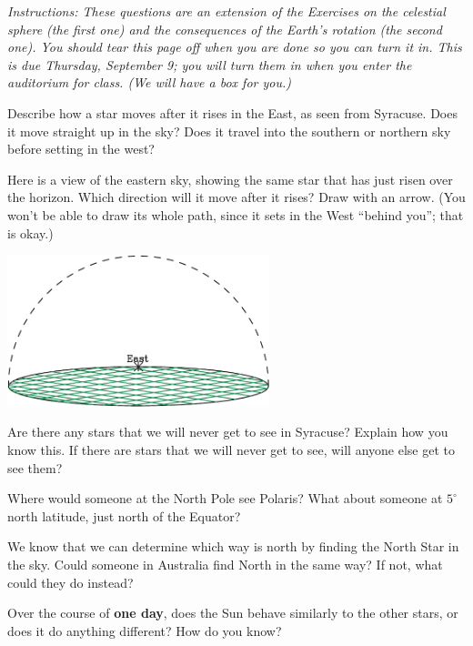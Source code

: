 \documentclass[12pt]{article}
\newcommand{\insp}{\vspace{1in}}
\newcommand{\BS}{\bigskip}
\begin{document}
{\it Instructions: These questions are an extension of the Exercises on the celestial sphere (the first one) and the consequences of the Earth's rotation (the second one). You should tear this page off when you are done so you can turn it in. This is due Thursday, September 9; you will turn them in when you enter the auditorium for class. (We will have a box for you.)}	

\begin{enumerate}
	\item Describe how a star moves after it rises in the East, as seen from Syracuse. Does it move straight up in the sky? Does it travel into the southern or northern sky before setting in the west?
	
	\insp\insp
	
	\begin{minipage}{0.5\textwidth}
	\item Here is a view of the eastern sky, showing the same star that has just risen over the horizon. Which direction will it move after it rises? Draw with an arrow. (You won't be able to draw its whole path, since it sets in the West ``behind you''; that is okay.)
\end{minipage}
\begin{minipage}{0.5\textwidth}
	\includegraphics[width=3in]{disk2-crop.pdf}
	\end{minipage}

\BS
\item Are there any stars that we will never get to see in Syracuse? Explain how you know this. If there are stars that we will never get to see, will anyone else get to see them? 

\insp\insp

\item Where would someone at the North Pole see Polaris? What about someone at $5^\circ$ north latitude, just north of the Equator?

\insp\insp

\item We know that we can determine which way is north by finding the North Star in the sky. Could someone in Australia find North in the same way? If not, what could they do instead?

\insp\insp

\item Over the course of {\bf one day}, does the Sun behave similarly to the other stars, or does it do anything different? How do you know?


	
	
\end{enumerate}	

	
\end{document}
